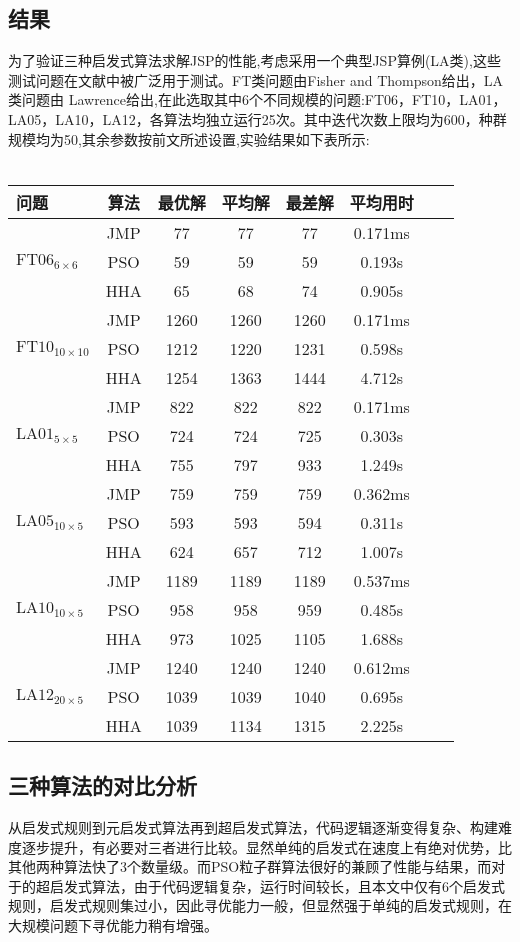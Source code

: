 \documentclass[UTF8]{ctexart}
\begin{document}
\begin{multicols}{2}
\subsection{结果}
为了验证三种启发式算法求解JSP的性能,考虑采用一个典型JSP算例(LA类),这些测试问题在文献中被广泛用于测试。FT类问题由Fisher and Thompson给出，LA类问题由 Lawrence给出,在此选取其中6个不同规模的问题:FT06，FT10，LA01，LA05，LA10，LA12，各算法均独立运行25次。其中迭代次数上限均为600，种群规模均为50,其余参数按前文所述设置,实验结果如下表所示:\\\\
\begin{tabular}{l*{6}{c}r}
\hline
问题 & 算法 & 最优解 & 平均解 & 最差解 & 平均用时 \\
\hline
\multirow{3}{*}{$\text{FT06}_{6\times 6}$}
& JMP &	77 & 77 & 77 & 0.171ms\\
& PSO & 59 & 59 & 59 & 0.193s \\
& HHA & 65 & 68 & 74 & 0.905s \\	
\hline
\multirow{3}{*}{$\text{FT10}_{10\times 10}$}
& JMP &	1260 & 1260 & 1260 & 0.171ms\\
& PSO & 1212 & 1220 & 1231 & 0.598s \\
& HHA & 1254 & 1363 & 1444 & 4.712s \\
\hline
\multirow{3}{*}{$\text{LA01}_{5 \times 5}$}
& JMP &	822 & 822 & 822 & 0.171ms\\
& PSO & 724 & 724 & 725 & 0.303s \\
& HHA & 755 & 797 & 933 & 1.249s \\
\hline
\multirow{3}{*}{$\text{LA05}_{10\times 5}$}
& JMP &	759 & 759 & 759 & 0.362ms\\
& PSO & 593 & 593 & 594 & 0.311s \\
& HHA & 624 & 657 & 712 & 1.007s \\
\hline
\multirow{3}{*}{$\text{LA10}_{10\times 5}$}
& JMP &	1189 & 1189 & 1189 & 0.537ms\\
& PSO & 958 & 958 & 959 & 0.485s \\
& HHA & 973 & 1025 &1105 & 1.688s \\
\hline
\multirow{3}{*}{$\text{LA12}_{20\times 5}$}
& JMP &	1240 & 1240 & 1240 & 0.612ms\\
& PSO & 1039 & 1039 & 1040 & 0.695s \\
& HHA & 1039 & 1134 & 1315 & 2.225s \\
\hline
\end{tabular}

\subsection{三种算法的对比分析}
从启发式规则到元启发式算法再到超启发式算法，代码逻辑逐渐变得复杂、构建难度逐步提升，有必要对三者进行比较。显然单纯的启发式在速度上有绝对优势，比其他两种算法快了3个数量级。而PSO粒子群算法很好的兼顾了性能与结果，而对于的超启发式算法，由于代码逻辑复杂，运行时间较长，且本文中仅有6个启发式规则，启发式规则集过小，因此寻优能力一般，但显然强于单纯的启发式规则，在大规模问题下寻优能力稍有增强。


\end{multicols}
\end{document}
